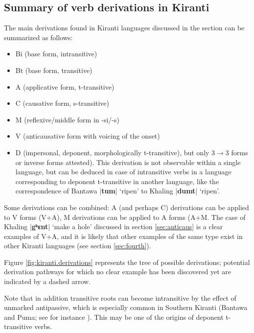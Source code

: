 \documentclass[oldfontcommands,oneside,a4paper,11pt]{article}
\newcommand{\ipa}[1]{\textbf{{\phon\mbox{#1}}}} %
\newcommand{\dhatu}[2]{|\ipa{#1}| `#2'}
\begin{document}
\subsection{Summary of verb derivations in Kiranti}
The main derivations found in Kiranti languages discussed in the section can be summarized as follows:

\begin{itemize}
\item  Bi (base form, intransitive)
\item  Bt (base form, transitive)
\item  A (applicative form, t-transitive)
\item  C (causative form, s-transitive)
\item M (reflexive/middle form in -si/-s)
\item V (anticausative form with voicing of the onset)
\item D (impersonal, deponent, morphologically t-transitive), but only 3$\rightarrow$3 forms or inverse forms attested). This derivation is not observable within a single language, but can be deduced in case of intransitive verbs in a language corresponding to deponent t-transitive in another language, like  the correspondence of Bantawa \dhatu{tum}{ripen} to Khaling \dhatu{dumt}{ripen}.
\end{itemize}

Some derivations can be combined: A (and perhaps C) derivations can be applied to V forms (V+A), M derivations can be applied to A forms (A+M. The case of Khaling \dhatu{gʰɛnt}{make a hole} discussed in section \ref{sec:anticaus} is a clear examples of V+A, and it is likely that other examples of the same type exist in other Kiranti languages (see section \ref{sec:fourth}). 

Figure \ref{fig:kiranti.derivations} represents the tree of possible derivations; potential derivation pathways for which no clear example has been discovered yet are indicated by a dashed arrow. 

Note that in addition transitive roots can become intransitive by the effect of unmarked antipassive, which is especially common in Southern Kiranti (Bantawa and Puma; see for instance \citealt{bickel07puma}). This may be one of the origins of deponent t-transitive verbs.
\end{document}

